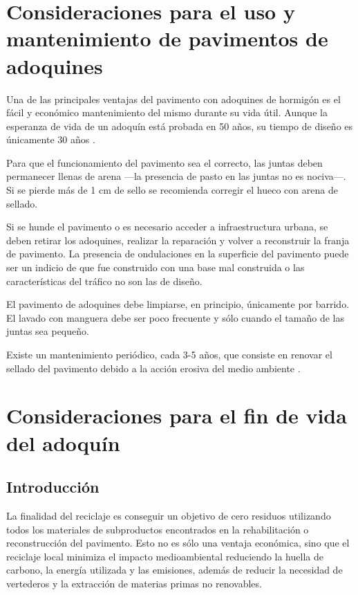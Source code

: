 \section{Consideraciones para el uso y mantenimiento de pavimentos de adoquines}\label{sec:consideracionesuso}

Una de las principales ventajas del pavimento con adoquines de hormigón es el fácil y económico mantenimiento del mismo durante su vida útil. Aunque la esperanza de vida de un adoquín está probada en 50 años, su tiempo de diseño es únicamente 30 años \cite{euroadoquin}.

Para que el funcionamiento del pavimento sea el correcto, las juntas deben permanecer llenas de arena —la presencia de pasto en las juntas no es nociva—. Si se pierde más de 1 \si{cm} de sello se recomienda corregir el hueco con arena de sellado.

Si se hunde el pavimento o es necesario acceder a infraestructura urbana, se deben retirar los adoquines, realizar la reparación y volver a reconstruir la franja de pavimento. La presencia de ondulaciones en la superficie del pavimento puede ser un indicio de que fue construido con una base mal construida o las características del tráfico no son las de diseño.

El pavimento de adoquines debe limpiarse, en principio, únicamente por barrido. El lavado con manguera debe ser poco frecuente y sólo cuando el tamaño de las juntas sea pequeño.

Existe un mantenimiento periódico, cada 3-5 años, que consiste en renovar el sellado del pavimento debido a la acción erosiva del medio ambiente \cite{malaka}.

\section{Consideraciones para el fin de vida del adoquín}\label{sec:consideracionesfindevida}

\subsection{Introducción}

La finalidad del reciclaje es conseguir un objetivo de cero residuos utilizando todos los materiales de subproductos encontrados en la rehabilitación o reconstrucción del pavimento. Esto no es sólo una ventaja económica, sino que el reciclaje local minimiza el impacto medioambiental reduciendo la huella de carbono, la energía utilizada y las emisiones, además de reducir la necesidad de vertederos y la extracción de materias primas no renovables.

